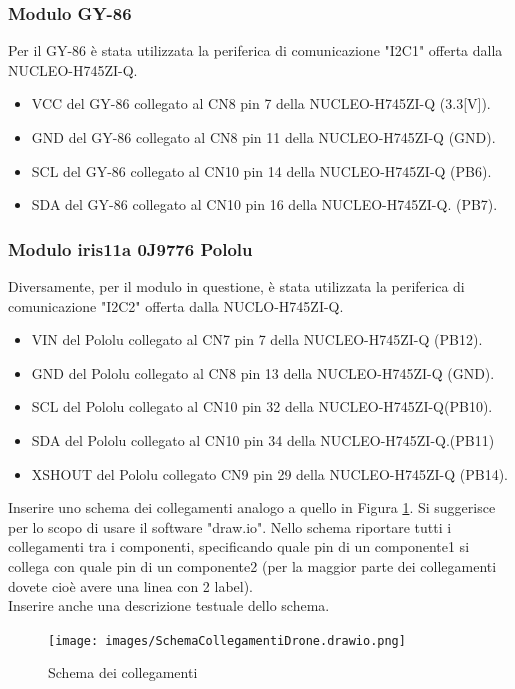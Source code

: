 \documentclass[11pt]{report}
\begin{document}
\subsubsection{Modulo GY-86}
Per il GY-86 è stata utilizzata la periferica di comunicazione "I2C1" offerta dalla NUCLEO-H745ZI-Q.
\begin{itemize}
\item VCC del GY-86 collegato al CN8 pin 7   della NUCLEO-H745ZI-Q (3.3[V]).
\item GND del GY-86 collegato al CN8 pin 11  della NUCLEO-H745ZI-Q (GND).
\item SCL del GY-86 collegato al CN10 pin 14 della NUCLEO-H745ZI-Q (PB6).
\item SDA del GY-86 collegato al CN10 pin 16 della NUCLEO-H745ZI-Q. (PB7).
\end{itemize}
\subsubsection{Modulo iris11a 0J9776 Pololu}
Diversamente, per il modulo in questione, è stata utilizzata la periferica di comunicazione "I2C2" offerta dalla NUCLO-H745ZI-Q.
\begin{itemize}
\item VIN del Pololu collegato al CN7 pin 7   della NUCLEO-H745ZI-Q (PB12).
\item GND del Pololu collegato al CN8 pin 13  della NUCLEO-H745ZI-Q (GND).
\item SCL del Pololu collegato al CN10 pin 32 della NUCLEO-H745ZI-Q(PB10).
\item SDA del Pololu collegato al CN10 pin 34 della NUCLEO-H745ZI-Q.(PB11)
\item XSHOUT del Pololu collegato CN9 pin 29 della NUCLEO-H745ZI-Q (PB14).
\end{itemize}
Inserire uno schema dei collegamenti analogo a quello in Figura \ref{fig:schema}. Si suggerisce per lo scopo di usare il software "draw.io". Nello schema riportare tutti i collegamenti tra i componenti, specificando quale pin di un componente1 si collega con quale pin di un componente2 (per la maggior parte dei collegamenti dovete cioè avere una linea con 2 label). \\
Inserire anche una descrizione testuale dello schema.

\begin{figure}[H]
    \centering
    \texttt{[image: images/SchemaCollegamentiDrone.drawio.png]}
    \caption{Schema dei collegamenti}
    \label{fig:schema}
    \end{figure}
\end{document}
